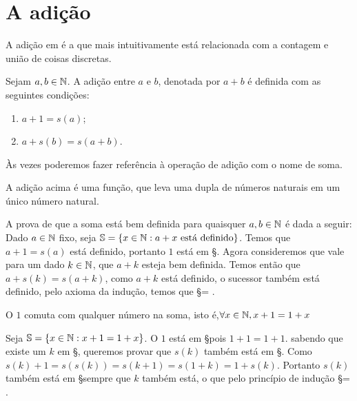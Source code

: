 \documentclass[../main.tex]{subfiles}
\begin{document}


\section{A adição}
A adição em \N é a que mais intuitivamente está relacionada com a contagem e união de coisas discretas.
\begin{defi}\label{def-adicao-N}
Sejam $a, b \in \mathbb{N}$. A adição entre $a$ e $b$, denotada por $a + b$ é definida com as seguintes condições: 
    \begin{enumerate}[label=(\roman*)]
        \item $a + 1 = s(a)$;
        \item $a + s(b) = s(a+b)$.
    \end{enumerate}
\end{defi}
Às vezes poderemos fazer referência à operação de adição com o nome de soma.

\begin{teo}
    A adição acima é uma função, que leva uma dupla de números naturais em um único número natural.
\end{teo}
\begin{dem}
    A prova de que a soma está bem definida para quaisquer $a,b \in \mathbb{N}$ é dada a seguir:
    Dado $a \in \mathbb{N}$ fixo, seja $\mathbb{S} = \{ x \in \mathbb{N} : a + x \ \text{está definido} \}$. Temos que $a + 1 = s(a)$ está definido, portanto $1$ está em \S. 
    Agora consideremos que vale para um dado $k \in \mathbb{N}$, que $a+k$ esteja bem definida. Temos então que $a + s(k) = s(a+k)$, como $a+k$ está definido, o sucessor também está definido, pelo axioma da indução, temos que \S = \N.
\end{dem}
\begin{lema}\label{soma-n-um-comut}
    O $1$ comuta com qualquer número na soma, isto é,$ \forall x \in \mathbb{N}, x + 1 = 1 + x$
\end{lema}
\begin{dem}
    Seja $\mathbb{S} = \{ x \in \mathbb{N} : x + 1 = 1 + x\}$. O $1$ está em \S pois $1 + 1 = 1 + 1$.
    sabendo que existe um $k$ em \S, queremos provar que $s(k)$ também está em \S. Como
    $s(k) + 1 = s(s(k)) = s(k+1) = s(1+k) = 1 + s(k)$. Portanto $s(k)$ também está em \S sempre que $k$ também está, o que pelo princípio de indução \S = \N.
\end{dem} \\
\end{document}
